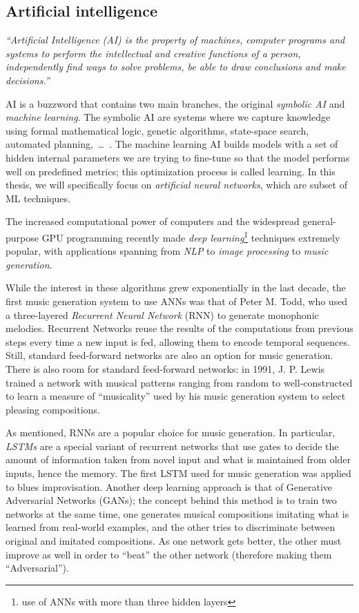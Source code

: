 \subsection{Artificial intelligence}\label{subsec:artificial-intelligence-music-generation}

\textit{``Artificial Intelligence (AI) is the property of machines, computer programs and systems to perform the intellectual and creative functions of a person, independently find ways to solve problems, be able to draw conclusions and make decisions.''}~\cite{about-ai}

AI is a buzzword that contains two main branches, the original \textit{symbolic AI} and \textit{machine learning}.
The symbolic AI are systems where we capture knowledge using formal mathematical logic, genetic algorithms, state-space search, automated planning,~\ldots~.
The machine learning AI builds models with a set of hidden internal parameters we are trying to fine-tune so that the model performs well on predefined metrics;
this optimization process is called learning.
In this thesis, we will specifically focus on \textit{artificial neural networks}, which are subset of ML techniques.

The increased computational power of computers and the widespread general-purpose GPU programming recently made \textit{deep learning}\footnote{use of ANNs with more than three hidden layers} techniques extremely popular, with applications spanning from \textit{NLP} to \textit{image processing} to \textit{music generation}.

While the interest in these algorithms grew exponentially in the last decade, the first music generation system to use ANNs was that of Peter M. Todd\cite{first-ann-mgs}, who used a three-layered \textit{Recurrent Neural Network} (RNN) to generate monophonic melodies.
Recurrent Networks reuse the results of the computations from previous steps every time a new input is fed, allowing them to encode temporal sequences.
Still, standard feed-forward networks are also an option for music generation.
There is also room for standard feed-forward networks: in 1991, J. P. Lewis trained a network\cite{feed-forward-ann-mgs} with musical patterns ranging from random to well-constructed to learn a measure of ``musicality'' used by his music generation system to select pleasing compositions.

As mentioned, RNNs are a popular choice for music generation.
In particular, \textit{LSTMs}\cite{LSTMs} are a special variant of recurrent networks that use gates to decide the amount of information taken from novel input and what is maintained from older inputs, hence the memory.
The first LSTM used for music generation was applied to blues improvisation\cite{LSTM-mgs}.
Another deep learning approach is that of Generative Adversarial Networks (GANs)\cite{gans};
the concept behind this method is to train two networks at the same time, one generates musical compositions imitating what is learned from real-world examples, and the other tries to discriminate between original and imitated compositions.
As one network gets better, the other must improve as well in order to ``beat'' the other network (therefore making them ``Adversarial'').

